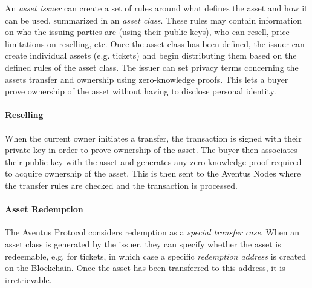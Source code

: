 An \textit{asset issuer} can create a set of rules around what defines the asset and how it can be used, summarized in an \textit{asset class}. These rules may contain information on who the issuing parties are (using their public keys), who can resell, price limitations on reselling, etc. Once the asset class has been defined, the issuer can create individual assets (e.g. tickets) and begin distributing them based on the defined rules of the asset class. The issuer can set privacy terms concerning the assets transfer and ownership using zero-knowledge proofs. This lets a buyer prove ownership of the asset without having to disclose personal identity.

\paragraph{Reselling}

When the current owner initiates a transfer, the transaction is signed with their private key in order to prove ownership of the asset. The buyer then associates their public key with the asset and generates any zero-knowledge proof required to acquire ownership of the asset. This is then sent to the Aventus Nodes where the transfer rules are checked and the transaction is processed.

\paragraph{Asset Redemption}

The Aventus Protocol considers redemption as a \textit{special transfer case}. When an asset class is generated by the issuer, they can specify whether the asset is redeemable, e.g. for tickets, in which case a specific \textit{redemption address} is created on the Blockchain. Once the asset has been transferred to this address, it is irretrievable.


